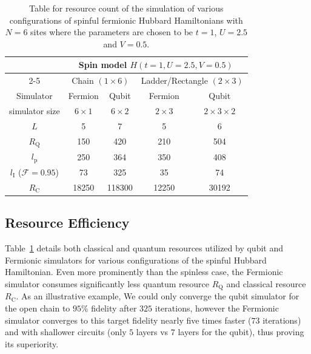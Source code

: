 \documentclass[aps, pra, reprint, superscriptaddress]{revtex4-1}
\begin{document}
\begin{table}[t]
\begin{tabular}{|c|cccc|}
\hline
&\multicolumn{4}{c|}{Spin model $H(t{=}1,U{=}2.5,V{=}0.5)$ }\\ 
\cline{2-5} 
\multirow{3}{*}{} &  
\multicolumn{2}{c|}{Chain $(1{\times} 6)$}  & 
\multicolumn{2}{c|}{Ladder/Rectangle $(2{\times} 3)$} \\ 
\hline
Simulator     & 
\multicolumn{1}{c|}{Fermion} & 
\multicolumn{1}{c|}{Qubit} & 
\multicolumn{1}{c|}{Fermion} & 
\multicolumn{1}{c|}{Qubit} \\ 
\hline
simulator size &  
\multicolumn{1}{c|}{$6{\times} 1$} & 
\multicolumn{1}{c|}{$6{\times} 2$} & 
\multicolumn{1}{c|}{$2{\times} 3$} &
\multicolumn{1}{c|}{$2{\times} 3{\times} 2$}  \\ 
\hline
$L$        &        
\multicolumn{1}{c|}{5} & 
\multicolumn{1}{c|}{7} & 
\multicolumn{1}{c|}{5} & 6     \\ 
\hline
$R_\text{Q}$  & 
\multicolumn{1}{c|}{150} & 
\multicolumn{1}{c|}{420} & 
\multicolumn{1}{c|}{210} & 504   \\ 
\hline
$l_\text{p}$           & 
\multicolumn{1}{c|}{250} & 
\multicolumn{1}{c|}{364} & 
\multicolumn{1}{c|}{350} & 408   \\ 
\hline
$l_{\text{I}}$ ($\mathcal{F}{=}0.95$)                 
& \multicolumn{1}{c|}{73}      
& \multicolumn{1}{c|}{325}     
& \multicolumn{1}{c|}{35}     & 74    \\ 
\hline
$R_\text{C}$   &  
\multicolumn{1}{c|}{18250}   & 
\multicolumn{1}{c|}{118300}   & 
\multicolumn{1}{c|}{12250}   & 30192 \\ \hline
\end{tabular}
\caption{Table for resource count of the simulation of various configurations of spinful fermionic Hubbard Hamiltonians with $N{=}6$ sites where the parameters are chosen to be $t{=}1$, $U{=}2.5$ and $V{=}0.5$.}
\label{table:spinful}
\end{table}

\subsection{Resource Efficiency}
\label{subsec:spinful_efficiency}
Table~\ref{table:spinful} details both classical and quantum resources utilized by qubit and Fermionic simulators for various configurations of the spinful Hubbard Hamiltonian. Even more prominently than the spinless case, the Fermionic simulator consumes significantly less quantum resource $R_\text{Q}$ and classical resource $R_\text{C}$. As an illustrative example, We could only converge the qubit simulator for the open chain to $95\%$ fidelity after  $325$ iterations, however the Fermionic simulator converges to this target fidelity nearly five times faster ($73$ iterations) and with shallower circuits (only $5$ layers vs $7$ layers for the qubit), thus proving its superiority.
\end{document}
